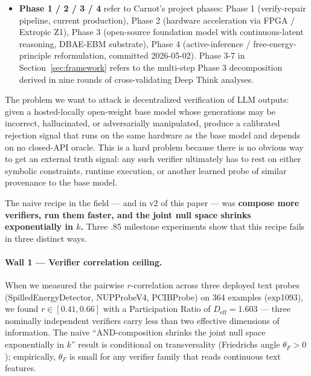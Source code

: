 \documentclass[10pt]{article}
\begin{document}
\begin{itemize}
    Carnot routes outputs through tiers of progressively more
    expensive verifiers, exiting at the first tier whose energy
    threshold either accepts or rejects with confidence. Tier 0a
    (ThinkPRM) is the cheapest; Tier 3 (Z3 SMT) is the most
    expensive and most precise. Section~\ref{sec:framework}
    defines each tier in detail.
  \item \textbf{Phase 1 / 2 / 3 / 4} refer to Carnot's project
    phases: Phase 1 (verify-repair pipeline, current production),
    Phase 2 (hardware acceleration via FPGA / Extropic Z1), Phase 3
    (open-source foundation model with continuous-latent reasoning,
    DBAE-EBM substrate), Phase 4 (active-inference / free-energy-
    principle reformulation, committed 2026-05-02). Phase 3-7 in
    Section~\ref{sec:framework} refers to the multi-step Phase 3
    decomposition derived in nine rounds of cross-validating
    Deep Think analyses.
\end{itemize}

The problem we want to attack is decentralized verification of
LLM outputs: given a hosted-locally open-weight base model whose
generations may be incorrect, hallucinated, or adversarially
manipulated, produce a calibrated rejection signal that runs on
the same hardware as the base model and depends on no closed-API
oracle. This is a hard problem because there is no obvious way to
get an external truth signal: any such verifier ultimately has to
rest on either symbolic constraints, runtime execution, or another
learned probe of similar provenance to the base model.

The naive recipe in the field --- and in v2 of this paper --- was
\textbf{compose more verifiers, run them faster, and the joint null
space shrinks exponentially in $k$.} Three .85 milestone experiments
show that this recipe fails in three distinct ways.

\paragraph{Wall 1 --- Verifier correlation ceiling.}
When we measured the pairwise $r$-correlation across three
deployed text probes (SpilledEnergyDetector, NUPProbeV4, PCIBProbe)
on 364 examples (exp1093), we found $r \in [0.41, 0.66]$ with a
Participation Ratio of $D_{\mathrm{eff}} = 1.603$ --- three
nominally independent verifiers carry less than two effective
dimensions of information. The naive ``AND-composition shrinks
the joint null space exponentially in $k$'' result is conditional
on transversality (Friedrichs angle $\theta_F > 0$); empirically,
$\theta_F$ is small for any verifier family that reads continuous
text features.
\end{document}
